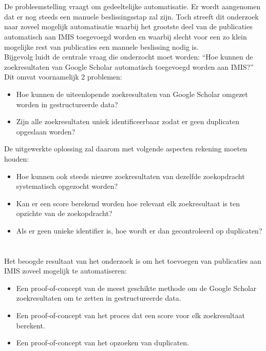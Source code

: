 \section{}%
\label{sec:onderzoeksvraag}

De probleemstelling vraagt om gedeeltelijke automatisatie. Er wordt aangenomen dat er nog steeds een manuele beslissingsstap zal zijn. Toch streeft dit onderzoek naar zoveel mogelijk automatisatie waarbij het grootste deel van de publicaties automatisch aan IMIS toegevoegd worden en waarbij slecht voor een zo klein mogelijke rest van publicaties een manuele beslissing nodig is.\\
Bijgevolg luidt de centrale vraag die onderzocht moet worden: ``Hoe kunnen de zoekresultaten van Google Scholar automatisch toegevoegd worden aan IMIS?''
Dit omvat voornamelijk 2 problemen:
\begin{itemize}
    \item Hoe kunnen de uiteenlopende zoekresultaten van Google Scholar omgezet worden in gestructureerde data?
    \item Zijn alle zoekresultaten uniek identificeerbaar zodat er geen duplicaten opgeslaan worden?
\end{itemize}
De uitgewerkte oplossing zal daarom met volgende aspecten rekening moeten houden:
\begin{itemize}
    \item Hoe kunnen ook steeds nieuwe zoekresultaten van dezelfde zoekopdracht systematisch opgezocht worden?
    \item Kan er een score berekend worden hoe relevant elk zoekresultaat is ten opzichte van de zoekopdracht?
    \item Als er geen unieke identifier is, hoe wordt er dan gecontroleerd op duplicaten? 
\end{itemize}

\section{}%
\label{sec:onderzoeksdoelstelling}

Het beoogde resultaat van het onderzoek is om het toevoegen van publicaties aan IMIS zoveel mogelijk te automatiseren:
\begin{itemize}
    \item Een proof-of-concept van de meest geschikte methode om de Google Scholar zoekresultaten om te zetten in gestructureerde data.
    \item Een proof-of-concept van het proces dat een score voor elk zoekresultaat berekent.
    \item Een proof-of-concept van het opzoeken van duplicaten.
\end{itemize}


